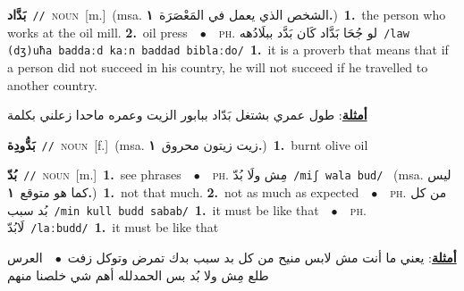 \documentclass[10pt,a4paper,twoside]{article} %
\begin{document}
\begin{multicols}{2}
{\setlength\topsep{0pt}\textbf{\foreignlanguage{arabic}{بَدَّاد}}\ {\color{gray}\texttt{//}\color{black}}\ \textsc{noun}\ [m.]\ \color{gray}(msa. \foreignlanguage{arabic}{الشخص الذي يعمل في المَعْصَرَة}~\foreignlanguage{arabic}{\textbf{١.}})\color{black}\ \textbf{1.}~the person who works at the oil mill.  \textbf{2.}~oil press\ \ $\bullet$\ \ \textsc{ph.} \color{gray} \foreignlanguage{arabic}{لو جُحَا بَدَّاد كَان بَدَّد ببلَادُهه}\color{black}\ {\color{gray}\texttt{/{\sffamily law (dʒ)uħa baddaːd kaːn baddad biblaːdo}/}\color{black}}\ \textbf{1.}~it is a proverb that means that if a person did not succeed in his country, he will not succeed if he travelled to another country.\  \begin{flushright}\color{gray}\foreignlanguage{arabic}{\textbf{\underline{\foreignlanguage{arabic}{أمثلة}}}: طول عمري بشتغل بَدّاد ببابور الزيت وعمره ماحدا زعلني بكلمة}\end{flushright}\color{black}} \vspace{2mm}

{\setlength\topsep{0pt}\textbf{\foreignlanguage{arabic}{بَدُّودِة}}\ {\color{gray}\texttt{//}\color{black}}\ \textsc{noun}\ [f.]\ \color{gray}(msa. \foreignlanguage{arabic}{زيت زيتون محروق}~\foreignlanguage{arabic}{\textbf{١.}})\color{black}\ \textbf{1.}~burnt olive oil\ } \vspace{2mm}

{\setlength\topsep{0pt}\textbf{\foreignlanguage{arabic}{بُدّ}}\ {\color{gray}\texttt{//}\color{black}}\ \textsc{noun}\ [m.]\ \textbf{1.}~see phrases\ \ $\bullet$\ \ \textsc{ph.} \color{gray} \foreignlanguage{arabic}{مِش ولَا بُدّ}\color{black}\ {\color{gray}\texttt{/{\sffamily miʃ wala bud}/}\color{black}}\ \color{gray} (msa. \foreignlanguage{arabic}{ليس كما هو متوقع}~\foreignlanguage{arabic}{\textbf{١.}})\color{black}\ \textbf{1.}~not that much.  \textbf{2.}~not as much as expected\ \ $\bullet$\ \ \textsc{ph.} \color{gray} \foreignlanguage{arabic}{من كل بُد سبب}\color{black}\ {\color{gray}\texttt{/{\sffamily min kull budd sabab}/}\color{black}}\ \textbf{1.}~it must be like that\ \ $\bullet$\ \ \textsc{ph.} \color{gray} \foreignlanguage{arabic}{لَابُدّ}\color{black}\ {\color{gray}\texttt{/{\sffamily laːbudd}/}\color{black}}\ \textbf{1.}~it must be like that\  \begin{flushright}\color{gray}\foreignlanguage{arabic}{\textbf{\underline{\foreignlanguage{arabic}{أمثلة}}}: يعني ما أنت مش لابس منيح من كل بد سبب بدك تمرض وتوكل زفت\ $\bullet$\ \  العرس طلع مِش ولا بُد بس الحمدلله أهم شي خلصنا منهم}\end{flushright}\color{black}} \vspace{2mm}


\end{multicols}
\end{document}
